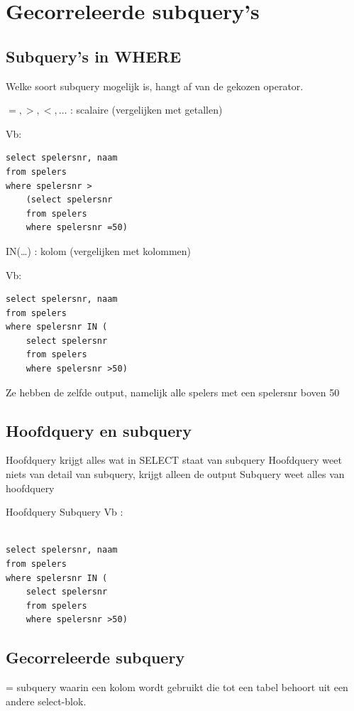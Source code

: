 \newpage
\section{Gecorreleerde subquery’s}

\subsection{Subquery’s in WHERE}

Welke soort subquery mogelijk is, hangt af van de gekozen operator.

$=, >, <, … $	: scalaire (vergelijken met getallen)

Vb:	
\begin{verbatim}
select spelersnr, naam
from spelers
where spelersnr >
    (select spelersnr 
    from spelers 
    where spelersnr =50) 
\end{verbatim}
	
IN(…) 		: kolom (vergelijken met kolommen)

Vb: 	
\begin{verbatim}
select spelersnr, naam
from spelers
where spelersnr IN (
    select spelersnr 
    from spelers 
    where spelersnr >50)
\end{verbatim}
	
Ze hebben de zelfde output, namelijk alle spelers met een spelersnr boven 50


\subsection{Hoofdquery en subquery}

\bi
\itf Hoofdquery krijgt alles wat in SELECT staat van subquery
\itf Hoofdquery weet niets van detail van subquery, krijgt alleen de output
\itf Subquery weet alles van hoofdquery
\ei

Hoofdquery
Subquery
Vb : 

\begin{verbatim}

select spelersnr, naam 
from spelers
where spelersnr IN (
    select spelersnr 
    from spelers 
    where spelersnr >50)
	\end{verbatim}


\subsection{Gecorreleerde subquery}

= subquery waarin een kolom wordt gebruikt die tot een tabel behoort uit een andere select-blok.

